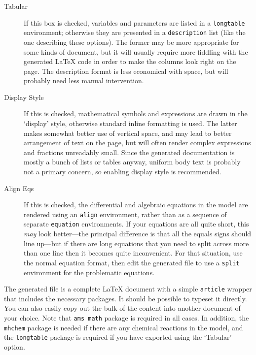 \documentclass[a4paper,11pt]{article}
\begin{document}
\begin{adjustwidth}{0.8cm}{0.8cm}
\begin{description}
\item[Tabular] If this box is checked, variables and parameters are listed in a \texttt{longtable} environment; otherwise they are presented in a \texttt{description} list (like the one describing these options). The former may be more appropriate for some kinds of document, but it will usually require more fiddling with the generated \LaTeX{} code in order to make the columns look right on the page. The description format is less economical with space, but will probably need less manual intervention.
\item[Display Style] If this is checked, mathematical symbols and expressions are drawn in the `display' style, otherwise standard inline formatting is used. The latter makes somewhat better use of vertical space, and may lead to better arrangement of text on the page, but will often render complex expressions and fractions unreadably small. Since the generated documentation is mostly a bunch of lists or tables anyway, uniform body text is probably not a primary concern, so enabling display style is recommended.
\item[Align Eqs] If this is checked, the differential and algebraic equations in the model are rendered using an \texttt{align} environment, rather than as a sequence of separate \texttt{equation} environments. If your equations are all quite short, this \textit{may} look better---the principal difference is that all the equals signs should line up---but if there are long equations that you need to split across more than one line then it becomes quite inconvenient. For that situation, use the normal equation format, then edit the generated file to use a \texttt{split} environment for the problematic equations.
\end{description}
\end{adjustwidth}

The generated file is a complete \LaTeX{} document with a simple \texttt{article} wrapper that includes the necessary packages. It should be possible to typeset it directly. You can also easily copy out the bulk of the content into another document of your choice. Note that \texttt{ams math} package is required in all cases. In addition, the \texttt{mhchem} package is needed if there are any chemical reactions in the model, and the \texttt{longtable} package is required if you have exported using the `Tabular' option.
\end{document}

